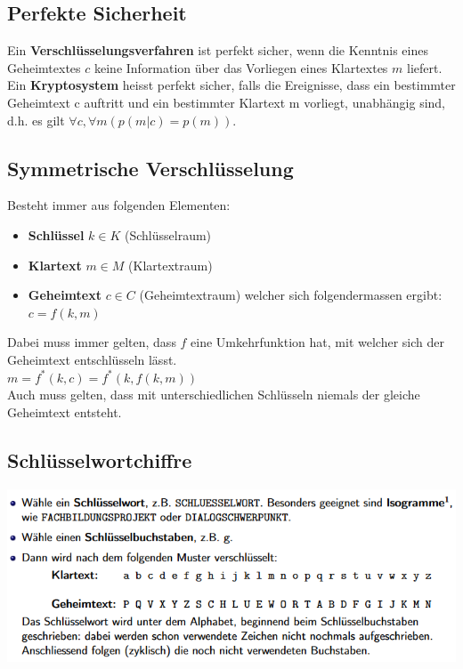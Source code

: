 \documentclass[12pt]{scrartcl}
\begin{document}
\subsection{Perfekte Sicherheit}
Ein \textbf{Verschlüsselungsverfahren} ist perfekt sicher, wenn die Kenntnis eines Geheimtextes $c$ keine Information
über das Vorliegen eines Klartextes $m$ liefert.\\

Ein \textbf{Kryptosystem} heisst perfekt sicher, falls die Ereignisse, dass ein bestimmter Geheimtext c
auftritt und ein bestimmter Klartext m vorliegt, unabhängig sind, d.h. es gilt
$\forall c, \forall m (p(m \vert c) = p(m))$.\\

\subsection{Symmetrische Verschlüsselung}
Besteht immer aus folgenden Elementen:
\begin{itemize}
    \item \textbf{Schlüssel} $k \in K$ (Schlüsselraum)
    \item \textbf{Klartext} $m \in M$ (Klartextraum)
    \item \textbf{Geheimtext} $c \in C$ (Geheimtextraum) welcher sich folgendermassen ergibt:
    $c = f(k, m)$
\end{itemize}

Dabei muss immer gelten, dass $f$ eine Umkehrfunktion hat, mit welcher sich der Geheimtext
entschlüsseln lässt.\\

$m = f^*(k, c) = f^*(k, f(k, m))$\\

Auch muss gelten, dass mit unterschiedlichen Schlüsseln niemals der gleiche Geheimtext entsteht.\\


\subsection{Schlüsselwortchiffre}
\includegraphics[width=14cm]{img/schluesselwortchiffre.png}
\end{document}
